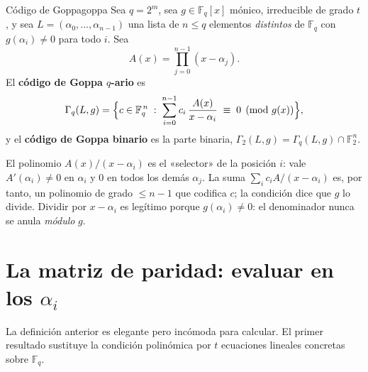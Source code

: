 \documentclass[11pt,a4paper,oneside]{report}
\newcommand{\F}{\mathbb{F}}
\newcommand{\GF}[1]{\mathbb{F}_{#1}}
\newcommand{\Ftwo}{\F_2}
\begin{document}
\begin{definicion}{Código de Goppa}{goppa}
Sea $q=2^m$, sea $g\in\GF{q}[x]$ mónico, irreducible de grado $t$, y sea
$L=(\alpha_0,\dots,\alpha_{n-1})$ una lista de $n\le q$ elementos
\emph{distintos} de $\GF{q}$ con $g(\alpha_i)\neq0$ para todo $i$. Sea
\[
A(x)=\prod_{j=0}^{n-1}(x-\alpha_j).
\]
El \textbf{código de Goppa $q$-ario} es
\[
\Gamma_q(L,g)=\Bigl\{c\in\GF{q}^{\,n}\;:\;
\sum_{i=0}^{n-1} c_i\,\frac{A(x)}{x-\alpha_i}\;\equiv\;0 \pmod{g(x)}
\Bigr\},
\]
y el \textbf{código de Goppa binario} es la parte binaria,
$\Gamma_2(L,g)=\Gamma_q(L,g)\cap\Ftwo^n$.
\end{definicion}

\begin{idea}
El polinomio $A(x)/(x-\alpha_i)$ es el «selector» de la posición $i$:
vale $A'(\alpha_i)\neq0$ en $\alpha_i$ y $0$ en todos los demás $\alpha_j$.
La suma $\sum_i c_i A/(x-\alpha_i)$ es, por tanto, un polinomio de grado
$\le n-1$ que codifica $c$; la condición dice que $g$ lo divide. Dividir
por $x-\alpha_i$ es legítimo porque $g(\alpha_i)\neq0$: el denominador
nunca se anula \emph{módulo} $g$.
\end{idea}

\section{La matriz de paridad: evaluar en los $\alpha_i$}

La definición anterior es elegante pero incómoda para calcular. El primer
resultado sustituye la condición polinómica por $t$ ecuaciones lineales
concretas sobre $\GF{q}$.
\end{document}
